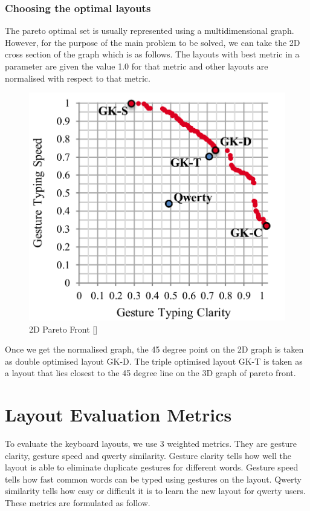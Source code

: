 \documentclass[MTech]{iitmdiss}
\begin{document}
\newpage
\subsection{Choosing the optimal layouts}
The pareto optimal set is usually represented using a multidimensional graph. However, for the purpose of the main problem to be solved, we can take the 2D cross section of the graph which is as follows. The layouts with best metric in a parameter are given the value 1.0 for that metric and other layouts are normalised with respect to that metric.


\begin{figure}[h!]
	\centering
	\includegraphics[scale=0.5]{Images/svc}
	\caption{2D Pareto Front [\cite{gesturerecog}]}
\end{figure}

Once we get the normalised graph, the 45 degree point on the 2D graph is taken as double optimised layout GK-D.
The triple optimised layout GK-T is taken as a layout that lies closest to the 45 degree line on the 3D graph of pareto front.

\chapter{Layout Evaluation Metrics}
To evaluate the keyboard layouts, we use 3 weighted metrics. They are gesture clarity, gesture speed and qwerty similarity. Gesture clarity tells how well the layout is able to eliminate duplicate gestures for different words. Gesture speed tells how fast common words can be typed using gestures on the layout. Qwerty similarity tells how easy or difficult it is to learn the new layout for qwerty users.\\
These metrics are formulated as follow.
\end{document}
